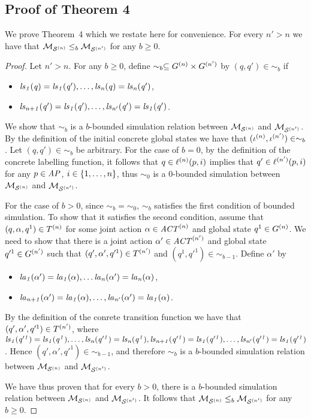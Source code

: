 \documentclass{article}
\newenvironment{customthm}[1]
  {\renewcommand\theinnercustomthm{#1}\innercustomthm}
  {\endinnercustomthm}
\begin{document}
\subsection{Proof of Theorem 4}
We prove Theorem~4 which we restate here for convenience.
\begin{customthm}{4}
For every $n' > n$ we have that $\mathcal{M}_{\mathcal{S}^{(n)}} \leq_b \mathcal{M}_{\mathcal{S}^{(n')}}$ for any $b \geq 0$.
\end{customthm}
\begin{proof}
Let $n' > n$. For any $b \geq 0$, define $\sim_b \subseteq G^{(n)}
    \times G^{(n')}$ by $(q,q') \in \sim_b$ if
\begin{itemize}
    \item $\it{ls}_{1}(q) = \it{ls}_{1}(q'), \ldots, \it{ls}_{n}(q) = \it{ls}_{n}(q')$,
    \item $\it{ls}_{n+1}(q')=\it{ls}_{1}(q'), \ldots, \it{ls}_{n'}(q')=\it{ls}_{1}(q')$.
\end{itemize}
We show that $\sim_b$ is a $b$-bounded simulation relation between $\mathcal{M}_{\mathcal{S}^{(n)}}$
    and $\mathcal{M}_{\mathcal{S}^{(n')}}$. By the definition of the initial concrete global states we
    have that $(\iota^{({n})}, \iota^{({n'})}) \in \sim_b$. Let $(q, q') \in
    \sim_b$ be arbitrary. For the case of $b=0$, by the definition of the concrete labelling function, 
    it follows that $q \in \ell^{(n)}(p, i)$ implies that $q' \in \ell^{(n')}(p, i)$ for any $p \in \it{AP}$, $i \in \left \{ 1,\ldots,n \right \}$, thus $\sim_0$ is a $0$-bounded simulation between $\mathcal{M}_{\mathcal{S}^{(n)}}$ and $\mathcal{M}_{\mathcal{S}^{(n')}}$. 

    For the case of $b > 0$, since $\sim_b = \sim_0$, $\sim_b$ satisfies the first condition of bounded simulation. To show that it satisfies the second condition, assume that $(q, \alpha, q^1) \in T^{(n)}$ for some joint action
    $\alpha \in \mathit{ACT}^{(n)}$ and global state $q^1 \in G^{(n)}$. We
    need to show that there is a joint action $\alpha' \in \mathit{ACT}^{(n')}$ and
    global state $q'^1 \in G^{(n')}$ such that $(q', \alpha', q'^1)
    \in T^{(n')}$ and  $(q^1, q'^1) \in \sim_{b-1}$.  Define $\alpha'$ by 
    \begin{itemize}
        \item $\it{la}_{1}({\alpha'}) = \it{la}_{1}({\alpha}), \ldots \it{la}_{n}({\alpha'})=\it{la}_{n}({\alpha})$,
        \item $\it{la}_{n+1}({\alpha'}) = \it{la}_{1}({\alpha}), \ldots, \it{la}_{n'}({\alpha'}) = \it{la}_{1}({\alpha})$.
    \end{itemize}
    By the definition of the conrete transition function we have that $(q',
    \alpha', q'^1) \in T^{(n')}$, where $\it{ls}_{1}(q'^1) = \it{ls}_{1}(q^1),
    \ldots, \it{ls}_{n}(q'^1)=\it{ls}_{n}(q^1),
    \it{ls}_{n+1}(q'^1)=\it{ls}_{1}(q'^1),\ldots,\it{ls}_{n'}(q'^1)=\it{ls}_{1}(q'^1)$. Hence $(q',
    \alpha', q'^1) \in \sim_{b-1}$, and therefore $\sim_b$ is a $b$-bounded simulation relation between $\mathcal{M}_{\mathcal{S}^{(n)}}$ and $\mathcal{M}_{\mathcal{S}^{(n')}}$. 

We have thus proven that for every $b > 0$, there  is a $b$-bounded simulation
    relation between $\mathcal{M}_{\mathcal{S}^{(n)}}$ and $\mathcal{M}_{\mathcal{S}^{(n')}}$. It follows that  $\mathcal{M}_{\mathcal{S}^{(n)}}
    \leq_b \mathcal{M}_{\mathcal{S}^{(n')}}$ for any $b \geq 0$.
\end{proof}
\end{document}
